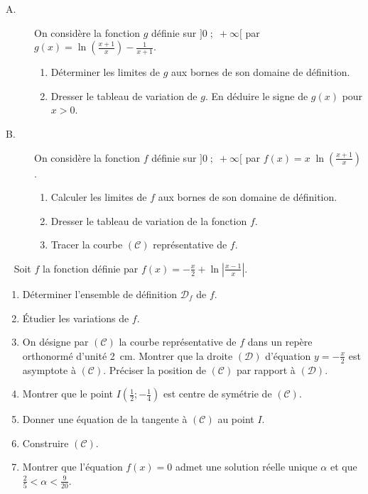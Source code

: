 \begin{exo}
\label{exo:el x ln}
\begin{description}
\item[A.] On consid\`ere la fonction $g$ d\'efinie sur $]0 \; ; \; +\infty[$ par
      $g(x) = \ln \left( \frac{x+1}{x} \right) - \frac{1}{x+1}$.
      \begin{enumerate}
      \item D\'eterminer les limites de $g$ aux bornes de son domaine de d\'efinition.
      \item Dresser le tableau de variation de $g$.
            En d\'eduire le signe de $g(x)$ pour $x > 0$.
      \end{enumerate}
\item[B.] On consid\`ere la fonction $f$ d\'efinie sur $]0 \; ; \; +\infty[$ par
      $f(x) = x \; \ln \left( \frac{x+1}{x} \right)$.
      \begin{enumerate}
      \item Calculer les limites de $f$ aux bornes de son domaine de d\'efinition.
      \item Dresser le tableau de variation de la fonction $f$.
      \item Tracer la courbe $(\mathscr{C})$ repr\'esentative de $f$.
      \end{enumerate}
\end{description}
\end{exo}
\begin{exo} ~ \newline
\label{exo:el ln valeur absolue}
Soit $f$ la fonction d\'efinie par $f(x) = - \frac{x}{2} + \ln \left| \frac{x-1}{x} \right| $.
\begin{enumerate}
\item D\'eterminer l'ensemble de d\'efinition $\mathcal{D}_f$ de $f$.
\item \'Etudier les variations de $f$.
\item On d\'esigne par $(\mathscr{C})$ la courbe repr\'esentative de $f$ dans un rep\`ere orthonorm\'e \Oij d'unit\'e 2~cm.
      Montrer que la droite $(\mathcal{D})$ d'\'equation $y = -\frac{x}{2}$ est asymptote \`a $(\mathscr{C})$.
      Pr\'eciser la position de $(\mathscr{C})$ par rapport \`a $(\mathcal{D})$.
\item Montrer que le point $I \left( \frac{1}{2} ; -\frac{1}{4} \right)$ est centre de sym\'etrie de $(\mathscr{C})$.
\item Donner une \'equation de la tangente \`a $(\mathscr{C})$ au point $I$.
\item Construire $(\mathscr{C})$.
\item Montrer que l'\'equation $f(x)=0$ admet une solution r\'eelle unique $\alpha$ et que $\frac{2}{5} < \alpha < \frac{9}{20}$.
\end{enumerate}
\end{exo}

